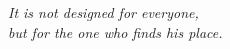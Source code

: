 \makeatletter
\begin{titlepage}
\centering
\vspace*{80mm}
{\songti\fontsize{20pt}{28pt}\selectfont\@title\par}
\vspace{15mm}
{\normalsize\@author\par}
\vspace{6mm}
{\normalsize\@date\par}
\vspace{40mm}
{\rmfamily\itshape\fontsize{11pt}{17pt}\selectfont
It is not designed for everyone,\\
but for the one who finds his place.\par}
\vfill
\end{titlepage}
\makeatother
